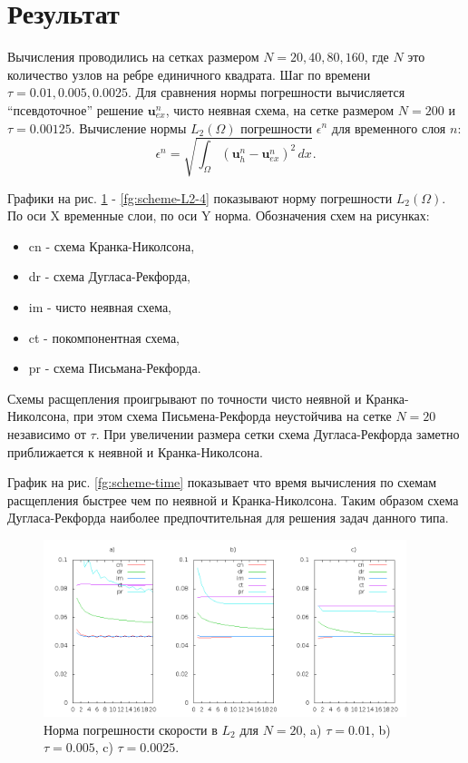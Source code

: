 \documentclass[12pt]{article}
\begin{document}
\section{Результат}
Вычисления проводились на сетках размером $N = 20, 40, 80, 160$, где $N$ это количество узлов на ребре единичного квадрата. Шаг по времени $\tau = 0.01, 0.005, 0.0025$. Для сравнения нормы погрешности вычисляется ``псевдоточное'' решение ${\bm u}_{ex}^n$, чисто неявная схема, на сетке размером $N=200$ и $\tau=0.00125$.
Вычисление нормы $L_2(\Omega)$ погрешности $\epsilon^n$ для временного слоя $n$:
$$
\epsilon^n = \sqrt{\int_{\Omega} ({\bm u}_h^n - {\bm u}_{ex}^n )^2 \, dx}.
$$

Графики на рис. \ref{fg:scheme-L2-1} - \ref{fg:scheme-L2-4} показывают норму погрешности $L_2(\Omega)$. По оси X временные слои, по оси Y норма. Обозначения схем на рисунках:
\begin{itemize}
\item cn - схема Кранка-Николсона,
\item dr - схема Дугласа-Рекфорда,
\item im - чисто неявная схема,
\item ct - покомпонентная схема,
\item pr - схема Письмана-Рекфорда.
\end{itemize}
Схемы расщепления проигрывают по точности чисто неявной и Кранка-Николсона, при этом  схема Письмена-Рекфорда неустойчива на сетке $N=20$ независимо от $\tau$. При увеличении размера сетки схема Дугласа-Рекфорда заметно приближается к неявной и Кранка-Николсона.

График на рис. \ref{fg:scheme-time} показывает что время вычисления по схемам расщепления быстрее чем по неявной и Кранка-Николсона. Таким образом схема Дугласа-Рекфорда наиболее предпочтительная для решения задач данного типа.

\begin{figure}
	\begin{center}
		\includegraphics[width=400px]{data160/error_1}
		\caption{Норма погрешности скорости в $L_2$ для $N=20$, a) $\tau=0.01$, b) $\tau=0.005$, c) $\tau=0.0025$.}
		\label{fg:scheme-L2-1}
	\end{center}
\end{figure}
\end{document}
